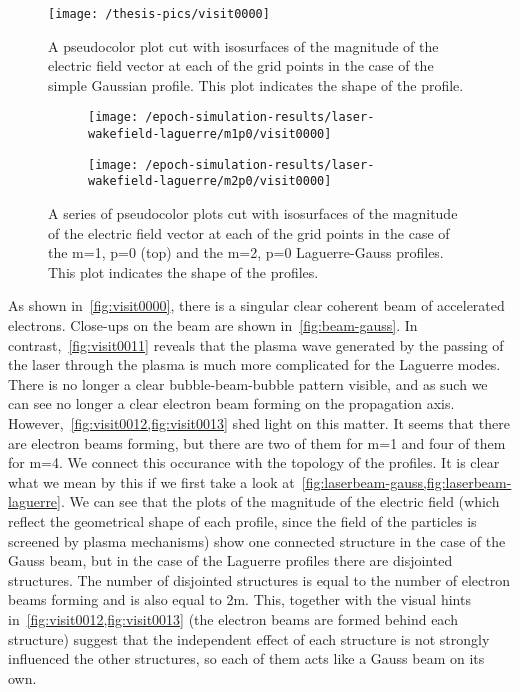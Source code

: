 \documentclass[12pt, class=report, crop=false]{standalone}
\begin{document}
\begin{figure}[!h]
  \centering
  \texttt{[image: /thesis-pics/visit0000]}%
  \caption{A pseudocolor plot cut with isosurfaces of the magnitude of the electric field vector at each of the grid points in the case of the simple Gaussian profile. This plot indicates the shape of the profile.}
  \label{fig:laserbeam-gauss}%
\end{figure}

\begin{figure}[!h]
  \centering
  \begin{subfigure}[t]{0.6\textwidth}
    \centering
    \texttt{[image: /epoch-simulation-results/laser-wakefield-laguerre/m1p0/visit0000]}
  \end{subfigure}
  \hfill
  \begin{subfigure}[t]{0.6\textwidth}
    \centering
    \texttt{[image: /epoch-simulation-results/laser-wakefield-laguerre/m2p0/visit0000]}
  \end{subfigure}
  \caption{A series of pseudocolor plots cut with isosurfaces of the magnitude of the electric field vector at each of the grid points in the case of the m=1, p=0 (top) and the m=2, p=0 Laguerre-Gauss profiles. This plot indicates the shape of the profiles.}%
  \label{fig:laserbeam-laguerre}%
\end{figure}

As shown in~\cref{fig:visit0000}, there is a singular clear coherent beam of accelerated electrons. Close-ups on the beam are shown in~\cref{fig:beam-gauss}. In contrast,~\cref{fig:visit0011} reveals that the plasma wave generated by the passing of the laser through the plasma is much more complicated for the Laguerre modes. There is no longer a clear bubble-beam-bubble pattern visible, and as such we can see no longer a clear electron beam forming on the propagation axis. However,~\cref{fig:visit0012,fig:visit0013} shed light on this matter. It seems that there are electron beams forming, but there are two of them for m=1 and four of them for m=4. We connect this occurance with the topology of the profiles. It is clear what we mean by this if we first take a look at~\cref{fig:laserbeam-gauss,fig:laserbeam-laguerre}. We can see that the plots of the magnitude of the electric field (which reflect the geometrical shape of each profile, since the field of the particles is screened by plasma mechanisms) show one connected structure in the case of the Gauss beam, but in the case of the Laguerre profiles there are disjointed structures. The number of disjointed structures is equal to the number of electron beams forming and is also equal to 2m. This, together with the visual hints in~\cref{fig:visit0012,fig:visit0013} (the electron beams are formed behind each structure) suggest that the independent effect of each structure is not strongly influenced the other structures, so each of them acts like a Gauss beam on its own.
\end{document}
